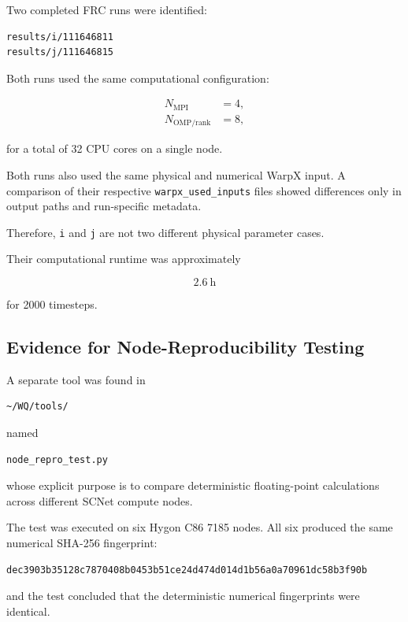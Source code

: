 \documentclass[11pt,a4paper]{article}
\begin{document}
Two completed FRC runs were identified:

\begin{lstlisting}
results/i/111646811
results/j/111646815
\end{lstlisting}

Both runs used the same computational configuration:

\begin{align*}
N_{\mathrm{MPI}} &= 4,\\
N_{\mathrm{OMP/rank}} &= 8,
\end{align*}

for a total of 32 CPU cores on a single node.

Both runs also used the same physical and numerical WarpX input. A comparison of their respective \texttt{warpx\_used\_inputs} files showed differences only in output paths and run-specific metadata.

Therefore, \texttt{i} and \texttt{j} are not two different physical parameter cases.

Their computational runtime was approximately

\[
2.6~\mathrm{h}
\]

for 2000 timesteps.

\subsection{Evidence for Node-Reproducibility Testing}

A separate tool was found in

\begin{lstlisting}
~/WQ/tools/
\end{lstlisting}

named

\begin{lstlisting}
node_repro_test.py
\end{lstlisting}

whose explicit purpose is to compare deterministic floating-point calculations across different SCNet compute nodes.

The test was executed on six Hygon C86 7185 nodes. All six produced the same numerical SHA-256 fingerprint:

\begin{lstlisting}
dec3903b35128c7870408b0453b51ce24d474d014d1b56a0a70961dc58b3f90b
\end{lstlisting}

and the test concluded that the deterministic numerical fingerprints were identical.
\end{document}
